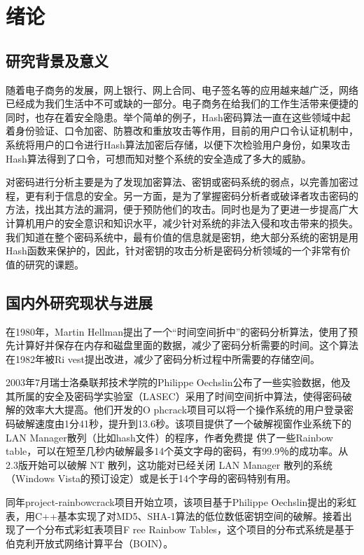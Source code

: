 \chapter{绪论}
\section{研究背景及意义}
 随着电子商务的发展，网上银行、网上合同、电子签名等的应用越来越广泛，网络已经成为我们生活中不可或缺的一部分。电子商务在给我们的工作生活带来便捷的同时，也存在着安全隐患。举个简单的例子，Hash密码算法一直在这些领域中起着身份验证、口令加密、防篡改和重放攻击等作用，目前的用户口令认证机制中，系统将用户的口令进行Hash算法加密后存储，以便下次检验用户身份，如果攻击Hash算法得到了口令，可想而知对整个系统的安全造成了多大的威胁。

对密码进行分析主要是为了发现加密算法、密钥或密码系统的弱点，以完善加密过程，更有利于信息的安全。另一方面，是为了掌握密码分析者或破译者攻击密码的方法，找出其方法的漏洞，便于预防他们的攻击。同时也是为了更进一步提高广大计算机用户的安全意识和知识水平，减少针对系统的非法入侵和攻击带来的损失。我们知道在整个密码系统中，最有价值的信息就是密钥，绝大部分系统的密钥是用Hash函数来保护的，因此，针对密钥的攻击分析是密码分析领域的一个非常有价值的研究的课题。

\section{国内外研究现状与进展}
在1980年，Martin Hellman\cite{hellman}提出了一个“时间空间折中”的密码分析算法，使用了预先计算好并保存在内存和磁盘里面的数据，减少了密码分析需要的时间。这个算法在1982年被Ri
vest提出改进，减少了密码分析过程中所需要的存储空间。  

2003年7月瑞士洛桑联邦技术学院的Philippe Oechslin公布了一些实验数据，他及其所属的安全及密码学实验室（LASEC）采用了时间空间折中算法，使得密码破解的效率大大提高。他们开发的O
phcrack项目可以将一个操作系统的用户登录密码破解速度由1分41秒，提升到13.6秒\cite{PO}。该项目提供了一个破解视窗作业系统下的LAN Manager散列（比如hash文件）的程序，作者免费提
供了一些Rainbow table，可以在短至几秒内破解最多14个英文字母的密码，有99.9％的成功率。从2.3版开始可以破解 NT 散列，这功能对已经关闭 LAN Manager 散列的系统（Windows Vista的预订设定）或是长于14个字母的密码特别有用。

同年project-rainbowcrack项目开始立项，该项目基于Philippe Oechslin提出的彩虹表，用C++基本实现了对MD5、SHA-1算法的低位数低密钥空间的破解\cite{zhu}。接着出现了一个分布式彩虹表项目F
ree Rainbow Tables，这个项目的分布式系统是基于伯克利开放式网络计算平台（BOIN）。

